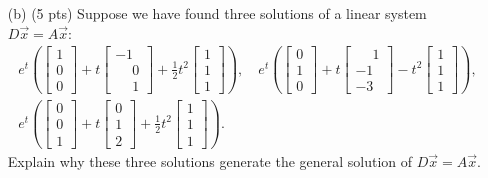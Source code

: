 \documentclass[12pt]{article}
\newcommand{\bx}{\vec{x}}
\begin{document}
\begin{enumerate}
\begin{enumerate}
     \item[(b)] (5 pts) Suppose we have found three solutions of a linear system $D\bx = A\bx$:
     \begin{gather*}
     e^t \left( \begin{bmatrix} 1 \\0 \\0 \end{bmatrix} +      t \begin{bmatrix} -1 \\ \phantom{-}0 \\ \phantom{-} 1   \end{bmatrix}
      + \frac{1}{2} t^2 \begin{bmatrix} 1\\1\\1\end{bmatrix}\right), \quad
 e^t \left( \begin{bmatrix} 0 \\1 \\0 \end{bmatrix} +
      t \begin{bmatrix} \phantom{-}1 \\ -1 \\ -3   \end{bmatrix}
      - t^2 \begin{bmatrix} 1\\1\\1\end{bmatrix}\right),  \\  
      e^t \left( \begin{bmatrix} 0 \\0 \\1 \end{bmatrix} +
      t \begin{bmatrix} 0 \\ 1 \\ 2   \end{bmatrix}
      + \frac{1}{2} t^2 \begin{bmatrix} 1\\1\\1\end{bmatrix}\right).
  \end{gather*}
  Explain why these three solutions generate the general solution of
  $D\bx = A\bx$.
      
      
     \end{enumerate}     
          
          
          

\end{enumerate}
\end{document}
